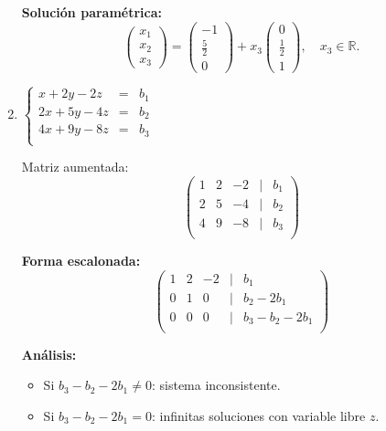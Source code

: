 \begin{prob}
\begin{enumerate}[$a)$]
\begin{myproof}
    \textbf{Solución paramétrica:}
    \[
    \begin{pmatrix} x_1 \\ x_2 \\ x_3 \end{pmatrix} = 
    \begin{pmatrix} -1 \\ \frac{5}{2} \\ 0 \end{pmatrix} + 
    x_3 \begin{pmatrix} 0 \\ \frac{1}{2} \\ 1 \end{pmatrix}, \quad x_3 \in \mathbb{R}.
    \]
    \end{myproof}

 \item $ \left\lbrace\begin{array}{ccc}
x+2y-2z&=&b_1\\
2x+5y-4z&=&b_2\\
4x+9y-8z&=&b_3\\
\end{array} \right.  $ 
    
    \begin{myproof}
    Matriz aumentada:
    \[
    \begin{pmatrix}
    1 & 2 & -2 & | & b_1 \\
    2 & 5 & -4 & | & b_2 \\
    4 & 9 & -8 & | & b_3 \\
    \end{pmatrix}
    \]
    
    \textbf{Forma escalonada:}
    \[
    \begin{pmatrix}
    1 & 2 & -2 & | & b_1 \\
    0 & 1 & 0 & | & b_2 - 2b_1 \\
    0 & 0 & 0 & | & b_3 - b_2 - 2b_1 \\
    \end{pmatrix}
    \]
    
    \textbf{Análisis:} 
    \begin{itemize}
    \item Si $b_3 - b_2 - 2b_1 \neq 0$: sistema inconsistente.
    \item Si $b_3 - b_2 - 2b_1 = 0$: infinitas soluciones con variable libre $z$.
    \end{itemize}
    

\end{myproof}
\end{enumerate}
\end{prob}
